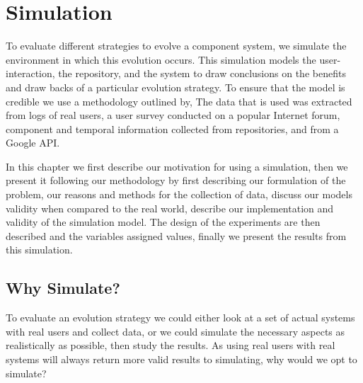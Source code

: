 \chapter{Simulation}
{}To evaluate different strategies to evolve a component system, we simulate the environment in which this evolution occurs.
{}This simulation models the user-interaction, the repository, and the system
{}to draw conclusions on the benefits and draw backs of a particular evolution strategy.
{}To ensure that the model is credible we use a methodology outlined by, %
{}The data that is used was extracted from logs of real users, a user survey conducted on a popular Internet forum, 
{}component and temporal information collected from repositories, and from a Google API.

{}In this chapter we first describe our motivation for using a simulation,
{}then we present it following our methodology by
{}first describing our formulation of the problem,
{}our reasons and methods for the collection of data,
{}discuss our models validity when compared to the real world,
{}describe our implementation and validity of the simulation model.
{}The design of the experiments are then described and the variables assigned values,
{}finally we present the results from this simulation.
 
\section{Why Simulate?}
To evaluate an evolution strategy we could either look at a set of actual systems with real users and collect data,
or we could simulate the necessary aspects as realistically as possible, then study the results.
As using real users with real systems will always return more valid results to simulating,
why would we opt to simulate?

